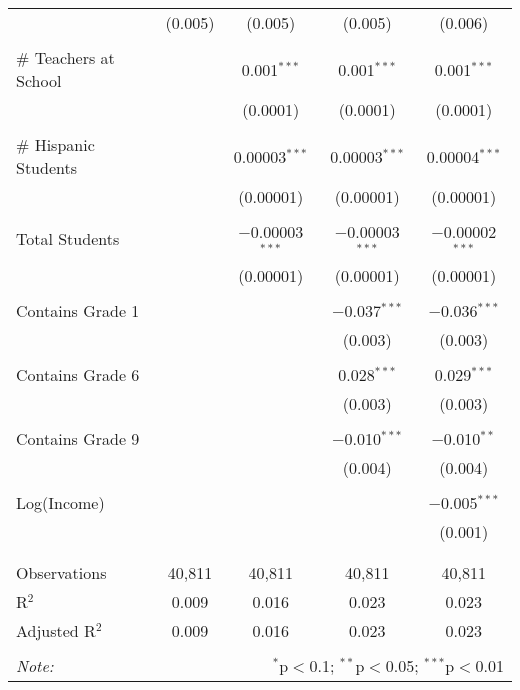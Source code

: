 \begin{table}[!htbp]
\begin{tabular}{@{\extracolsep{-2pt}}lcccc}
  & (0.005) & (0.005) & (0.005) & (0.006) \\ 
  & & & & \\ 
 \# Teachers at School &  & 0.001$^{***}$ & 0.001$^{***}$ & 0.001$^{***}$ \\ 
  &  & (0.0001) & (0.0001) & (0.0001) \\ 
  & & & & \\ 
 \# Hispanic Students &  & 0.00003$^{***}$ & 0.00003$^{***}$ & 0.00004$^{***}$ \\ 
  &  & (0.00001) & (0.00001) & (0.00001) \\ 
  & & & & \\ 
 Total Students &  & $-$0.00003$^{***}$ & $-$0.00003$^{***}$ & $-$0.00002$^{***}$ \\ 
  &  & (0.00001) & (0.00001) & (0.00001) \\ 
  & & & & \\ 
 Contains Grade 1 &  &  & $-$0.037$^{***}$ & $-$0.036$^{***}$ \\ 
  &  &  & (0.003) & (0.003) \\ 
  & & & & \\ 
 Contains Grade 6 &  &  & 0.028$^{***}$ & 0.029$^{***}$ \\ 
  &  &  & (0.003) & (0.003) \\ 
  & & & & \\ 
 Contains Grade 9 &  &  & $-$0.010$^{***}$ & $-$0.010$^{**}$ \\ 
  &  &  & (0.004) & (0.004) \\ 
  & & & & \\ 
 Log(Income) &  &  &  & $-$0.005$^{***}$ \\ 
  &  &  &  & (0.001) \\ 
  & & & & \\ 
\hline \\[-1.8ex] 
Observations & 40,811 & 40,811 & 40,811 & 40,811 \\ 
R$^{2}$ & 0.009 & 0.016 & 0.023 & 0.023 \\ 
Adjusted R$^{2}$ & 0.009 & 0.016 & 0.023 & 0.023 \\ 
\hline 
\hline \\[-1.8ex] 
\textit{Note:}  & \multicolumn{4}{r}{$^{*}$p$<$0.1; $^{**}$p$<$0.05; $^{***}$p$<$0.01} \\ 
\end{tabular} 
\end{table} 
